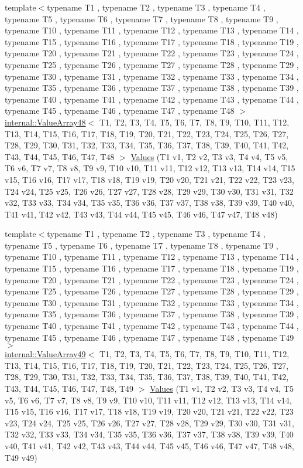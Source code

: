 \begin{DoxyCompactItemize}
\item 
{\footnotesize template$<$typename T1 , typename T2 , typename T3 , typename T4 , typename T5 , typename T6 , typename T7 , typename T8 , typename T9 , typename T10 , typename T11 , typename T12 , typename T13 , typename T14 , typename T15 , typename T16 , typename T17 , typename T18 , typename T19 , typename T20 , typename T21 , typename T22 , typename T23 , typename T24 , typename T25 , typename T26 , typename T27 , typename T28 , typename T29 , typename T30 , typename T31 , typename T32 , typename T33 , typename T34 , typename T35 , typename T36 , typename T37 , typename T38 , typename T39 , typename T40 , typename T41 , typename T42 , typename T43 , typename T44 , typename T45 , typename T46 , typename T47 , typename T48 $>$ }\\\mbox{\hyperlink{classtesting_1_1internal_1_1_value_array48}{internal\+::\+Value\+Array48}}$<$ T1, T2, T3, T4, T5, T6, T7, T8, T9, T10, T11, T12, T13, T14, T15, T16, T17, T18, T19, T20, T21, T22, T23, T24, T25, T26, T27, T28, T29, T30, T31, T32, T33, T34, T35, T36, T37, T38, T39, T40, T41, T42, T43, T44, T45, T46, T47, T48 $>$ \mbox{\hyperlink{namespacetesting_af3cdf373b137d357bb3a814c097bcd06}{Values}} (T1 v1, T2 v2, T3 v3, T4 v4, T5 v5, T6 v6, T7 v7, T8 v8, T9 v9, T10 v10, T11 v11, T12 v12, T13 v13, T14 v14, T15 v15, T16 v16, T17 v17, T18 v18, T19 v19, T20 v20, T21 v21, T22 v22, T23 v23, T24 v24, T25 v25, T26 v26, T27 v27, T28 v28, T29 v29, T30 v30, T31 v31, T32 v32, T33 v33, T34 v34, T35 v35, T36 v36, T37 v37, T38 v38, T39 v39, T40 v40, T41 v41, T42 v42, T43 v43, T44 v44, T45 v45, T46 v46, T47 v47, T48 v48)
\item 
{\footnotesize template$<$typename T1 , typename T2 , typename T3 , typename T4 , typename T5 , typename T6 , typename T7 , typename T8 , typename T9 , typename T10 , typename T11 , typename T12 , typename T13 , typename T14 , typename T15 , typename T16 , typename T17 , typename T18 , typename T19 , typename T20 , typename T21 , typename T22 , typename T23 , typename T24 , typename T25 , typename T26 , typename T27 , typename T28 , typename T29 , typename T30 , typename T31 , typename T32 , typename T33 , typename T34 , typename T35 , typename T36 , typename T37 , typename T38 , typename T39 , typename T40 , typename T41 , typename T42 , typename T43 , typename T44 , typename T45 , typename T46 , typename T47 , typename T48 , typename T49 $>$ }\\\mbox{\hyperlink{classtesting_1_1internal_1_1_value_array49}{internal\+::\+Value\+Array49}}$<$ T1, T2, T3, T4, T5, T6, T7, T8, T9, T10, T11, T12, T13, T14, T15, T16, T17, T18, T19, T20, T21, T22, T23, T24, T25, T26, T27, T28, T29, T30, T31, T32, T33, T34, T35, T36, T37, T38, T39, T40, T41, T42, T43, T44, T45, T46, T47, T48, T49 $>$ \mbox{\hyperlink{namespacetesting_a034785cd0f04e5f5ec9e16c1cad5ccde}{Values}} (T1 v1, T2 v2, T3 v3, T4 v4, T5 v5, T6 v6, T7 v7, T8 v8, T9 v9, T10 v10, T11 v11, T12 v12, T13 v13, T14 v14, T15 v15, T16 v16, T17 v17, T18 v18, T19 v19, T20 v20, T21 v21, T22 v22, T23 v23, T24 v24, T25 v25, T26 v26, T27 v27, T28 v28, T29 v29, T30 v30, T31 v31, T32 v32, T33 v33, T34 v34, T35 v35, T36 v36, T37 v37, T38 v38, T39 v39, T40 v40, T41 v41, T42 v42, T43 v43, T44 v44, T45 v45, T46 v46, T47 v47, T48 v48, T49 v49)

\end{DoxyCompactItemize}
